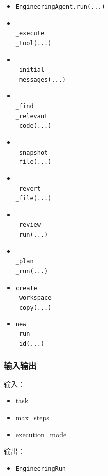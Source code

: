 \documentclass[UTF8,12pt,openany]{ctexbook}
\begin{document}
\begin{itemize}
\item \texttt{EngineeringAgent.run(...)}
\item \texttt{\\_execute\\_tool(...)}
\item \texttt{\\_initial\\_messages(...)}
\item \texttt{\\_find\\_relevant\\_code(...)}
\item \texttt{\\_snapshot\\_file(...)}
\item \texttt{\\_revert\\_file(...)}
\item \texttt{\\_review\\_run(...)}
\item \texttt{\\_plan\\_run(...)}
\item \texttt{create\\_workspace\\_copy(...)}
\item \texttt{new\\_run\\_id(...)}
\end{itemize}

\subsubsection{输入输出}

输入：\par

\begin{itemize}
\item task
\item max\_steps
\item execution\_mode
\end{itemize}

输出：\par

\begin{itemize}
\item \texttt{EngineeringRun}
\end{itemize}
\end{document}
